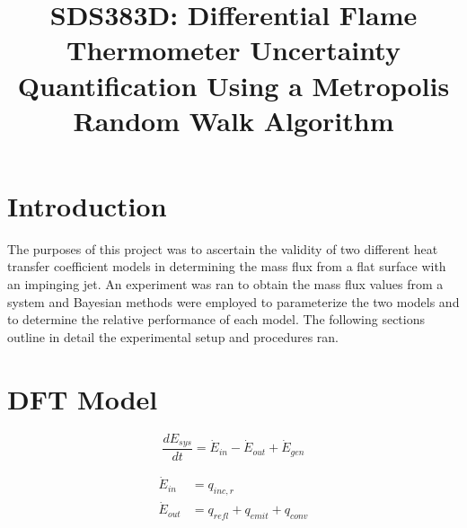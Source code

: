\documentclass[article]{proc}
\begin{document}


\title{SDS383D: Differential Flame Thermometer Uncertainty Quantification Using a Metropolis Random Walk Algorithm}



\address[1]{Department of Mechanical Engineering, The University of Texas at Austin, Austin, TX 78712}




\maketitle
\section{Introduction}

    The purposes of this project was to ascertain the validity of two different heat transfer coefficient models in determining the mass flux from a flat surface with an impinging jet. An experiment was ran to obtain the mass flux values from a system and Bayesian methods were employed to parameterize the two models and to determine the relative performance of each model. The following sections outline in detail the experimental setup and procedures ran.

\section{DFT Model}

\begin{equation}\label{eq:energy_stored}
    \frac{dE_{sys}}{dt} = \dot{E}_{in} - \dot{E}_{out} + \dot{E}_{gen}
\end{equation}

\begin{align}\label{eq:dft_balance}
    \dot{E}_{in} &= q_{inc,r} \\
    \dot{E}_{out} &= q_{refl} + q_{emit} + q_{conv} \\
\end{align}
\end{document}
